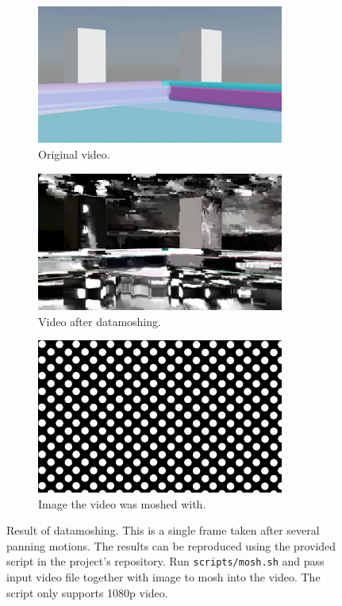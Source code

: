 \documentclass[11pt,english]{report}
\begin{document}
\begin{figure}[!ht]
	\centering
	\begin{subfigure}{230pt}
		\includegraphics[width=230pt]{docs/report/mosh-original.jpg}
		\caption{\centering Original video.}
	\end{subfigure}
	\begin{subfigure}{230pt}
		\includegraphics[width=230pt]{docs/report/moshed.jpg}
		\caption{\centering Video after datamoshing.}
	\end{subfigure}
	\begin{subfigure}{230pt}
		\includegraphics[width=230pt]{docs/report/mosh-to.jpg}
		\caption{\centering Image the video was moshed with.}
	\end{subfigure}
	\caption{\centering Result of datamoshing. This is a single frame taken after several panning motions. The results can be reproduced using the provided script in the project's repository. Run \texttt{scripts/mosh.sh} and pass input video file together with image to mosh into the video. The script only supports 1080p video.}
\end{figure}
\end{document}
